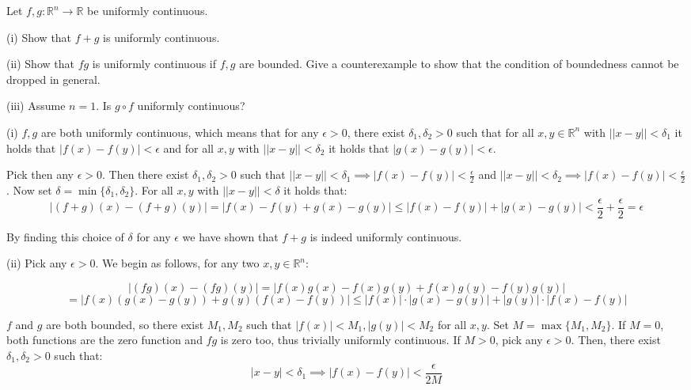 \newpage

\begin{exercise}{31}
    Let $f, g : \mathbb{R}^n \rightarrow \mathbb{R}$ be uniformly continuous.

    (i) Show that $f + g$ is uniformly continuous.

    (ii) Show that $fg$ is uniformly continuous if $f, g$ are bounded. Give a counterexample to show that the condition of boundedness cannot be dropped in general.

    (iii) Assume $n = 1$. Is $g \circ f$ uniformly continuous?
\end{exercise}

\begin{solution}

    (i) $f, g$ are both uniformly continuous, which means that for any $\epsilon > 0$, there exist $\delta_1, \delta_2 > 0$ such that for all $x, y \in \mathbb{R}^n$ with $\lvert \lvert x - y \rvert \rvert < \delta_1$ it holds that $ \lvert f(x) - f(y) \rvert < \epsilon$ and for  all $x, y$ with $\lvert \lvert x - y \rvert \rvert < \delta_2$ it holds that $ \lvert g(x) - g(y) \rvert < \epsilon$. 

    Pick then any $\epsilon > 0$. Then there exist $\delta_1, \delta_2 > 0$ such that $\lvert \lvert x - y \rvert \rvert < \delta_1 \implies \lvert f(x) - f(y) \rvert < \frac{\epsilon}{2}$ and $\lvert \lvert x - y \rvert \rvert < \delta_2 \implies \lvert f(x) - f(y) \rvert < \frac{\epsilon}{2}$. Now set $\delta = \min\{\delta_1, \delta_2\}$. For all $x, y$ with $\lvert \lvert x - y \rvert \rvert < \delta$ it holds that:
    $$\lvert (f+g)(x) - (f+g)(y) \rvert = \lvert f(x) - f(y) + g(x) - g(y) \rvert \leq \lvert f(x) - f(y) \rvert + \lvert  g(x) - g(y) \rvert < \frac{\epsilon}{2} + \frac{\epsilon}{2} = \epsilon$$

    By finding this choice of $\delta$ for any $\epsilon$ we have shown that $f+g$ is indeed uniformly continuous.

    (ii) Pick any $\epsilon > 0$. We begin as follows, for any two $x, y \in \mathbb{R}^n$:
    
    $$\lvert (fg)(x) - (fg)(y) \rvert = \lvert f(x)g(x) - f(x)g(y) + f(x)g(y) -f(y)g(y) \rvert$$
    $$= \lvert f(x)(g(x) - g(y)) + g(y)(f(x) - f(y)) \rvert \leq \lvert f(x) \rvert \cdot \lvert g(x) - g(y) \rvert + \lvert g(y) \rvert \cdot \lvert f(x) - f(y) \rvert$$

    $f$ and $g$ are both bounded, so there exist $M_1, M_2$ such that $\lvert f(x) \rvert <M_1, \lvert g(y) \rvert < M_2$ for all $x, y$. Set $M = \max\{M_1, M_2\}$. If $M = 0$, both functions are the zero function and $fg$ is zero too, thus trivially uniformly continuous. If $M > 0$, pick any $\epsilon > 0$. Then, there exist $\delta_1, \delta_2 > 0$ such that:
    $$\lvert  x - y \rvert  < \delta_1 \implies  \lvert f(x) - f(y)  \rvert< \frac{\epsilon}{2M}$$
    

\end{solution}
